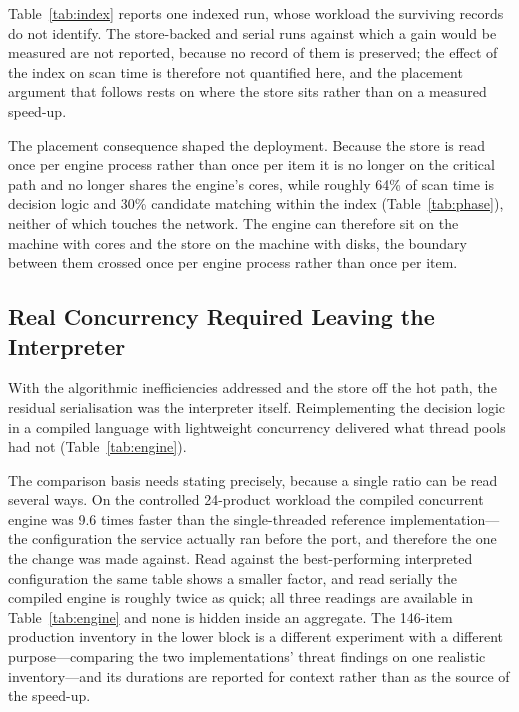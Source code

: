 \documentclass[fleqn,10pt,lineno]{wlpeerj}
\begin{document}


Table~\ref{tab:index} reports one indexed run, whose workload the surviving records do not identify. The store-backed and serial runs against which a gain would be measured are not reported, because no record of them is preserved; the effect of the index on scan time is therefore not quantified here, and the placement argument that follows rests on where the store sits rather than on a measured speed-up.

The placement consequence shaped the deployment. Because the store is read once per engine process rather than once per item it is no longer on the critical path and no longer shares the engine's cores, while roughly 64\% of scan time is decision logic and 30\% candidate matching within the index (Table~\ref{tab:phase}), neither of which touches the network. The engine can therefore sit on the machine with cores and the store on the machine with disks, the boundary between them crossed once per engine process rather than once per item.

\subsection{Real Concurrency Required Leaving the Interpreter}
With the algorithmic inefficiencies addressed and the store off the hot path, the residual serialisation was the interpreter itself. Reimplementing the decision logic in a compiled language with lightweight concurrency delivered what thread pools had not (Table~\ref{tab:engine}).



The comparison basis needs stating precisely, because a single ratio can be read several ways. On the controlled 24-product workload the compiled concurrent engine was 9.6 times faster than the single-threaded reference implementation---the configuration the service actually ran before the port, and therefore the one the change was made against. Read against the best-performing interpreted configuration the same table shows a smaller factor, and read serially the compiled engine is roughly twice as quick; all three readings are available in Table~\ref{tab:engine} and none is hidden inside an aggregate. The 146-item production inventory in the lower block is a different experiment with a different purpose---comparing the two implementations' threat findings on one realistic inventory---and its durations are reported for context rather than as the source of the speed-up.
\end{document}
